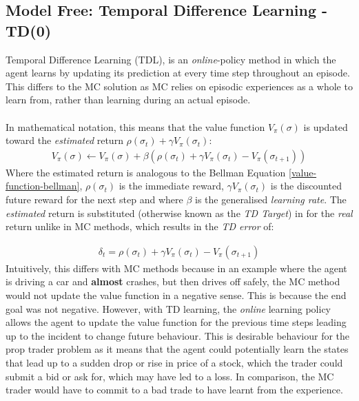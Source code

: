 \documentclass[ %
                    author={Ashwinder Khurana},
                supervisor={Prof Dave Cliff},
                    degree={MEng},
                     title={The Deeply Reinforced Trader},
                  subtitle={},
                      type={enterprise},
                      year={2020} ]{dissertation}
\begin{document}
{\subsection{Model Free: Temporal Difference Learning - TD(0)}
\label{subsection: Model Free:Temporal Difference Learning}
Temporal Difference Learning (TDL), is an \textit{online}-policy method in which the agent learns by updating its prediction at every time step throughout an episode. This differs to the MC solution as MC relies on episodic experiences as a whole to learn from, rather than learning during an actual episode.  
\\
\\
In mathematical notation, this means that the value function $V_\pi(\sigma)$ is updated toward the \textit{estimated} return $\rho(\sigma_t) + \gamma V_\pi (\sigma_t)$:
\begin{equation}
\label{TD error}
\begin{split}
V_\pi(\sigma) \leftarrow V_\pi(\sigma) + \beta(\rho(\sigma_t) + \gamma V_\pi (\sigma_t) - V_\pi(\sigma_{t+1}))
\end{split}
\end{equation}
\noindent
Where the estimated return is analogous to the Bellman Equation \ref{value-function-bellman}, $\rho(\sigma_t)$ is the immediate reward, $\gamma V_\pi(\sigma_t)$ is the discounted future reward for the next step and where $\beta$ is the generalised \textit{learning rate}. The \textit{estimated} return is substituted (otherwise known as the \textit{TD Target}) in for the \textit{real} return unlike in MC methods, which results in the \textit{TD error} of:

\begin{equation}
\label{TD error}
\begin{split}
\delta_t = \rho(\sigma_t) + \gamma V_\pi (\sigma_t) - V_\pi(\sigma_{t+1})
\end{split}
\end{equation}
\noindent
Intuitively, this differs with MC methods because in an example where the agent is driving a car and \textbf{almost} crashes, but then drives off safely, the MC method would not update the value function in a negative sense. This is because the end goal was not negative. However, with TD learning, the \textit{online} learning policy allows the agent to update the value function for the previous time steps leading up to the incident to change future behaviour. This is desirable behaviour for the prop trader problem as it means that the agent could potentially learn the states that lead up to a sudden drop or rise in price of a stock, which the trader could submit a bid or ask for, which may have led to a loss. In comparison, the MC trader would have to commit to a bad trade to have learnt from the experience. 
\\
\\

}
\end{document}
